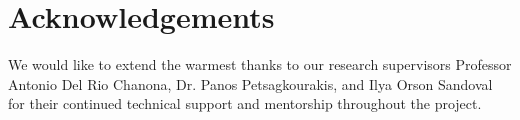 \documentclass[conference]{IEEEtran}
\theoremstyle{definition}
\begin{document}
\section{Acknowledgements}
We would like to extend the warmest thanks to our research supervisors Professor Antonio Del Rio Chanona, Dr. Panos Petsagkourakis, and Ilya Orson Sandoval for their continued technical support and mentorship throughout the project. 
\end{document}
